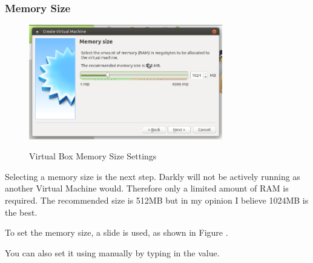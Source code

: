 \subsubsection{Memory Size}
\begin{figure}[!htb]
    \centering
    \includegraphics[width=0.752\textwidth]{images/00-02.png}\\[0cm]  
    \caption[Virtual Box]{Virtual Box Memory Size Settings}
    \label{fig:00-03 - Windows Virtual Box Memory Size} 
\end{figure}
Selecting a memory size is the next step. Darkly will not be actively running
as another Virtual Machine would. Therefore only a limited amount of RAM is
required. The recommended size is 512MB but in my opinion I believe 1024MB is
the best.

To set the memory size, a slide is used, as shown in Figure .

You can also set it using manually by typing in the value.

